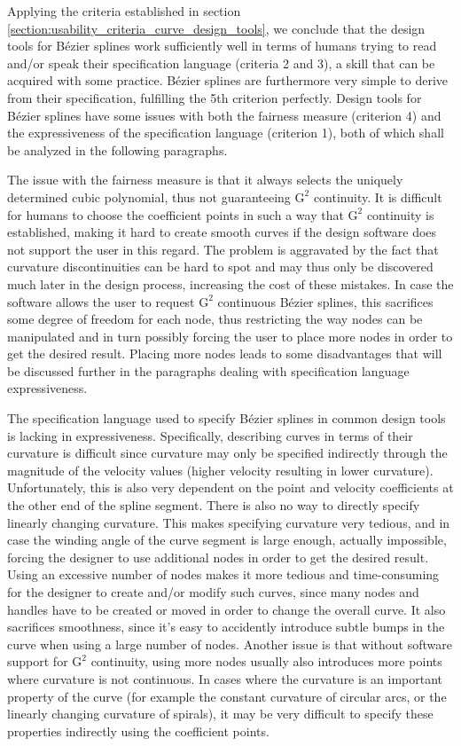 \documentclass[a4paper]{article}
\begin{document}
				Applying the criteria established in section \ref{section:usability_criteria_curve_design_tools}, we conclude that the design tools for Bézier splines work sufficiently well in terms of humans trying to read and/or speak their specification language (criteria 2 and 3), a skill that can be acquired with some practice. Bézier splines are furthermore very simple to derive from their specification, fulfilling the 5th criterion perfectly. Design tools for Bézier splines have some issues with both the fairness measure (criterion 4) and the expressiveness of the specification language (criterion 1), both of which shall be analyzed in the following paragraphs.

				The issue with the fairness measure is that it always selects the uniquely determined cubic polynomial, thus not guaranteeing \(\mathrm{G}^2\) continuity. It is difficult for humans to choose the coefficient points in such a way that \(\mathrm{G}^2\) continuity is established, making it hard to create smooth curves if the design software does not support the user in this regard. The problem is aggravated by the fact that curvature discontinuities can be hard to spot and may thus only be discovered much later in the design process, increasing the cost of these mistakes. In case the software allows the user to request \(\mathrm{G}^2\) continuous Bézier splines, this sacrifices some degree of freedom for each node, thus restricting the way nodes can be manipulated and in turn possibly forcing the user to place more nodes in order to get the desired result. Placing more nodes leads to some disadvantages that will be discussed further in the paragraphs dealing with specification language expressiveness.

				The specification language used to specify Bézier splines in common design tools is lacking in expressiveness. Specifically, describing curves in terms of their curvature is difficult since curvature may only be specified indirectly through the magnitude of the velocity values (higher velocity resulting in lower curvature). Unfortunately, this is also very dependent on the point and velocity coefficients at the other end of the spline segment. There is also no way to directly specify linearly changing curvature. This makes specifying curvature very tedious, and in case the winding angle of the curve segment is large enough, actually impossible, forcing the designer to use additional nodes in order to get the desired result. Using an excessive number of nodes makes it more tedious and time-consuming for the designer to create and/or modify such curves, since many nodes and handles have to be created or moved in order to change the overall curve. It also sacrifices smoothness, since it's easy to accidently introduce subtle bumps in the curve when using a large number of nodes. Another issue is that without software support for \(\mathrm{G}^2\) continuity, using more nodes usually also introduces more points where curvature is not continuous. In cases where the curvature is an important property of the curve (for example the constant curvature of circular arcs, or the linearly changing curvature of spirals), it may be very difficult to specify these properties indirectly using the coefficient points.
\end{document}
